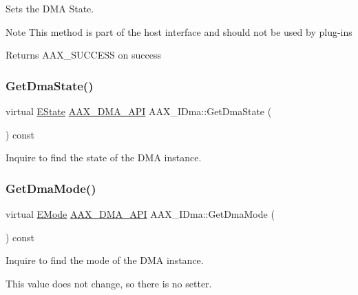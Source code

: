 Sets the D\+MA State. 

\begin{DoxyNote}{Note}
This method is part of the host interface and should not be used by plug-\/ins
\end{DoxyNote}
\begin{DoxyReturn}{Returns}
{\ttfamily A\+A\+X\+\_\+\+S\+U\+C\+C\+E\+SS} on success 
\end{DoxyReturn}
\mbox{\label{a01809_ab5cf4ad618853e4a94ed63a693d7b800}} 
\subsubsection{\texorpdfstring{GetDmaState()}{GetDmaState()}}
{\footnotesize\ttfamily virtual \mbox{\hyperlink{a01809_a64e694fd40d32179e429eb7934a64842}{E\+State}} \mbox{\hyperlink{a00587_acae60d01e5e4bd3282369d0d9d378f3f}{A\+A\+X\+\_\+\+D\+M\+A\+\_\+\+A\+PI}} A\+A\+X\+\_\+\+I\+Dma\+::\+Get\+Dma\+State (\begin{DoxyParamCaption}{ }\end{DoxyParamCaption}) const\hspace{0.3cm}{\ttfamily [pure virtual]}}



Inquire to find the state of the D\+MA instance. 

\mbox{\label{a01809_a9bd67775d41c32da19d5532362fe86c8}} 
\subsubsection{\texorpdfstring{GetDmaMode()}{GetDmaMode()}}
{\footnotesize\ttfamily virtual \mbox{\hyperlink{a01809_af8d0f19f2896dd6dbd126b919b24e39b}{E\+Mode}} \mbox{\hyperlink{a00587_acae60d01e5e4bd3282369d0d9d378f3f}{A\+A\+X\+\_\+\+D\+M\+A\+\_\+\+A\+PI}} A\+A\+X\+\_\+\+I\+Dma\+::\+Get\+Dma\+Mode (\begin{DoxyParamCaption}{ }\end{DoxyParamCaption}) const\hspace{0.3cm}{\ttfamily [pure virtual]}}



Inquire to find the mode of the D\+MA instance. 

This value does not change, so there is no setter. \mbox{\label{a01809_a92774eab2dec8864d617e2655f3de00d}} 
